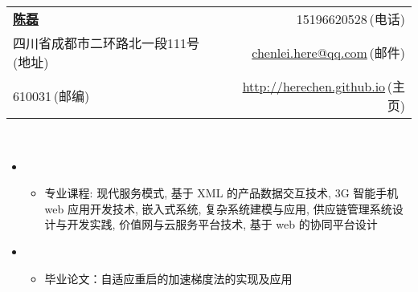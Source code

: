 \documentclass[letterpaper,11pt]{article}
\begin{document}

\newcommand{\myheader}{
\begin{tabular*}{7.0in}{l@{\extracolsep{\fill}}r}
  \textbf{\href{http://herechen.github.io}{\LARGE 陈磊}} & 15196620528$\,${\color{labelgrey}(电话)} \\
  四川省成都市二环路北一段111号$\,${\color{labelgrey}(地址)} & \href{mailto:chenlei.here@qq.com}{chenlei.here@qq.com}$\,${\color{labelgrey}(邮件)} \\
  610031$\,${\color{labelgrey}(邮编)} & \href{http://herechen.github.io}{http://herechen.github.io}$\,${\color{labelgrey}(主页)} \\
  \end{tabular*}\\\vspace{0.1in}}

\myheader

  \begin{itemize}
    \item
      {\footnotesize
      \begin{itemize}
        \item{专业课程:  现代服务模式, 基于 XML 的产品数据交互技术, 3G 智能手机 web 应用开发技术, 嵌入式系统, 复杂系统建模与应用, 供应链管理系统设计与开发实践, 价值网与云服务平台技术, 基于 web 的协同平台设计}
      \end{itemize}
      }
    \item
      {\footnotesize
      \begin{itemize}
        \item 毕业论文：自适应重启的加速梯度法的实现及应用
      \end{itemize}
      }
  \end{itemize}
\end{document}
